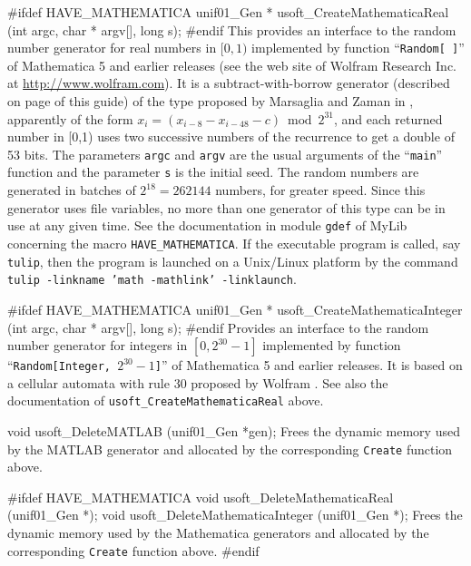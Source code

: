 {#ifdef HAVE_MATHEMATICA
   unif01_Gen * usoft_CreateMathematicaReal (int argc, char * argv[],
                                             long s);
#endif
\endcode
  \tab This provides an interface to the random number generator
%
  for real numbers in $[0, 1)$ implemented by function ``{\tt Random[ ]}'' of
  {Mathematica 5} and earlier releases (see the web site of
  Wolfram Research Inc. at \url{http://www.wolfram.com}). It is a
  subtract-with-borrow generator (described on page \pageref{gen:SWB}
   of this guide) of the type proposed by Marsaglia and Zaman
  in \cite{rMAR91a}, apparently of the form $x_i = (x_{i-8} - x_{i-48} - c)
  \bmod 2^{31}$, and each returned number in [0,1) uses two successive numbers
  of the recurrence to get a double of 53 bits.
  The parameters {\tt argc} and  {\tt argv} are the usual
  arguments of the ``{\tt main}'' function and the parameter
  {\tt s} is the initial seed.  The random numbers are
  generated in batches of $2^{18} = 262144$ numbers, for greater
  speed.
  Since this generator uses file variables, no more than one generator
  of this type can be in use at any given time.
  See the documentation in module {\tt gdef} of MyLib concerning
  the macro  {\tt HAVE\_MATHEMATICA}.
  If the executable program is called, say \texttt{tulip}, then the program
  is launched on a Unix/Linux platform by the command
  \texttt{tulip -linkname 'math -mathlink' -linklaunch}.
  \endtab
\code


#ifdef HAVE_MATHEMATICA
   unif01_Gen * usoft_CreateMathematicaInteger (int argc, char * argv[],
                                                long s);
#endif
\endcode
  \tab    Provides an interface to the random number generator
%
  for integers in $[0, 2^{30} - 1]$ implemented by function
   ``{\tt Random[Integer, {$2^{30} - 1$}]}'' of
  {Mathematica 5} and earlier releases. It is
  based on a cellular automata with rule 30 proposed by Wolfram
  \cite{rWOL86a}. See also the documentation of
  \texttt{usoft\_CreateMathematicaReal} above.
  \endtab


\code

void usoft_DeleteMATLAB (unif01_Gen *gen);
\endcode
 \tab  Frees the dynamic memory used by the {\sc MATLAB}
  generator and allocated by the corresponding {\tt Create} function
  above.
 \endtab
\code


#ifdef HAVE_MATHEMATICA
   void usoft_DeleteMathematicaReal (unif01_Gen *);
   void usoft_DeleteMathematicaInteger (unif01_Gen *);
\endcode
 \tab  Frees the dynamic memory used by the {\sc Mathematica}
  generators and allocated by the corresponding {\tt Create} function
  above.
 \endtab
\code
#endif


}

